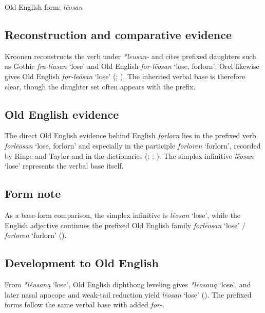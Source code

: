 \documentclass[
  british,
  a4paper,
  openany]{book}
\providecommand{\Recon}[1]{\emph{*#1}}
{\catcode`→=\active \global\def→{\ensuremath{\rightarrow}}}
\providecommand{\Recon}[1]{\emph{*#1}}
{\catcode`→=\active \global\def→{\ensuremath{\rightarrow}}}
\begin{document}
Old English form: \emph{lēosan}

\subsection{Reconstruction and comparative
evidence}\label{reconstruction-and-comparative-evidence-19}

Kroonen reconstructs the verb under \emph{*leusan-} and cites prefixed
daughters such as Gothic \emph{fra-liusan} `lose' and Old English
\emph{for-lēosan} `lose, forlorn'; Orel likewise gives Old English
\emph{for-leósan} `lose' (;
). The inherited verbal base is
therefore clear, though the daughter set often appears with the prefix.

\subsection{Old English evidence}\label{old-english-evidence-19}

The direct Old English evidence behind English \emph{forlorn} lies in
the prefixed verb \emph{forlēosan} `lose, forlorn' and especially in the
participle \emph{forloren} `forlorn', recorded by Ringe and Taylor and
in the dictionaries (; ;
). The
simplex infinitive \emph{lēosan} `lose' represents the verbal base
itself.

\subsection{Form note}\label{form-note-2}

As a base-form comparison, the simplex infinitive is \emph{lēosan}
`lose', while the English adjective continues the prefixed Old English
family \emph{forlēosan} `lose' / \emph{forloren} `forlorn'
().

\subsection{Development to Old
English}\label{development-to-old-english-19}

From \Recon{léusaną} `lose', Old English diphthong leveling gives
\Recon{lēosaną} `lose', and later nasal apocope and weak-tail reduction
yield \emph{lēosan} `lose' (). The prefixed forms follow the same verbal base with added
\emph{for-}.
\end{document}
